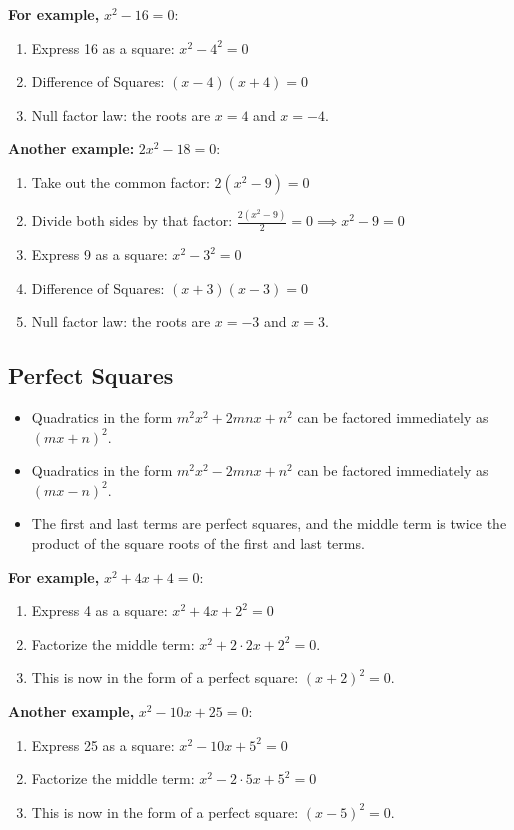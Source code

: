 \documentclass[12pt]{article}
\begin{document}
\textbf{For example,} $x^2-16=0:$
\begin{enumerate}
\item Express 16 as a square: $x^2-4^2=0$
\item Difference of Squares: $(x-4)(x+4)=0$
\item Null factor law: the roots are $x = 4$ and $x = -4$.
\end{enumerate}

\textbf{Another example:} $2x^2-18=0:$
\begin{enumerate}
\item Take out the common factor: $2(x^2-9)=0$
\item Divide both sides by that factor:
$\frac{2(x^2-9)}{2}=0 \implies x^2-9=0$
\item Express 9 as a square: $x^2-3^2=0$
\item Difference of Squares: $(x+3)(x-3)=0$
\item Null factor law: the roots are $x=-3$ and $x=3$.
\end{enumerate}

\subsection*{Perfect Squares}
\begin{itemize}
\item Quadratics in the form $m^2 x^2 + 2mnx + n^2$ can be factored immediately as $(mx + n)^2$.
\item Quadratics in the form $m^2x^2 - 2mnx + n^2$ can be factored immediately as $(mx - n)^2$.
\item The first and last terms are perfect squares, and the middle term is twice the product of the square roots of the first and last terms.
\end{itemize}

\textbf{For example,} $x^2+4x+4 = 0:$
\begin{enumerate}
\item Express 4 as a square: $x^2+4x+2^2=0$
\item Factorize the middle term: $x^2+2\cdot2x+2^2= 0.$
\item This is now in the form of a perfect square: $(x+2)^2 = 0$.
\end{enumerate}

\textbf{Another example,} $x^2-10x+25=0:$
\begin{enumerate}
\item Express 25 as a square: $x^2-10x+5^2=0$
\item Factorize the middle term: $x^2 - 2 \cdot 5x + 5^2 = 0$
\item This is now in the form of a perfect square: $(x-5)^2=0$.
\end{enumerate}
\end{document}
